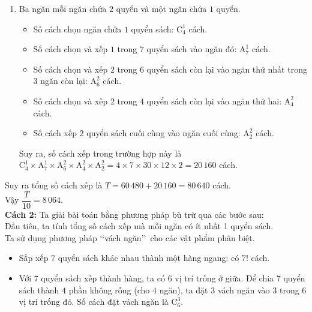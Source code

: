 \begin{ex}
{\begin{enumerate}[TH 1.]
\begin{itemize}
				\item Số cách chọn ngăn chứa $2$ quyển sách trong $3$ ngăn còn lại: $\mathrm{C}_3^1$ cách.
				\item Số cách chọn và xếp $2$ trong $4$ quyển sách còn lại vào ngăn đó: $\mathrm{A}_4^2$ cách.
				\item Số cách xếp $2$ quyển sách cuối cùng vào $2$ ngăn còn lại: $2!$ cách.
			\end{itemize}
			Suy ra, số cách xếp trong trường hợp này là $\mathrm{C}_4^1 \times \mathrm{A}_7^3 \times \mathrm{C}_3^1 \times \mathrm{A}_4^2 \times 2! = 4 \times 210 \times 3 \times 12 \times 2 = 60\,480$ cách.
			\item Ba ngăn mỗi ngăn chứa $2$ quyển và một ngăn chứa $1$ quyển.
			\begin{itemize}
				\item Số cách chọn ngăn chứa $1$ quyển sách: $\mathrm{C}_4^1$ cách.
				\item Số cách chọn và xếp $1$ trong $7$ quyển sách vào ngăn đó: $\mathrm{A}_7^1$ cách.
				\item Số cách chọn và xếp $2$ trong $6$ quyển sách còn lại vào ngăn thứ nhất trong $3$ ngăn còn lại: $\mathrm{A}_6^2$ cách.
				\item Số cách chọn và xếp $2$ trong $4$ quyển sách còn lại vào ngăn thứ hai: $\mathrm{A}_4^2$ cách.
				\item Số cách xếp $2$ quyển sách cuối cùng vào ngăn cuối cùng: $\mathrm{A}_2^2$ cách.
			\end{itemize}
			Suy ra, số cách xếp trong trường hợp này là $\mathrm{C}_4^1 \times \mathrm{A}_7^1 \times \mathrm{A}_6^2 \times \mathrm{A}_4^2 \times \mathrm{A}_2^2 = 4 \times 7 \times 30 \times 12 \times 2 = 20\,160$ cách.
		\end{enumerate}
		Suy ra tổng số cách xếp là $T=60\,480 + 20\,160 = 80\,640$ cách.\\
		Vậy $\dfrac{T}{10}=8\,064$.\\
		\textbf{Cách 2:} Ta giải bài toán bằng phương pháp bù trừ qua các bước sau:\\
		Đầu tiên, ta tính tổng số cách xếp mà mỗi ngăn có ít nhất 1 quyển sách.\\
		Ta sử dụng phương pháp \lq\lq vách ngăn\rq\rq\ cho các vật phẩm phân biệt.
		\begin{itemize}
			\item Sắp xếp $7$ quyển sách khác nhau thành một hàng ngang: có $7!$ cách.
			\item Với $7$ quyển sách xếp thành hàng, ta có $6$ vị trí trống ở giữa. Để chia $7$ quyển sách thành $4$ phần không rỗng (cho $4$ ngăn), ta đặt $3$ vách ngăn vào $3$ trong $6$ vị trí trống đó. Số cách đặt vách ngăn là $\mathrm{C}_6^3$.

\end{itemize}}
\end{ex}
